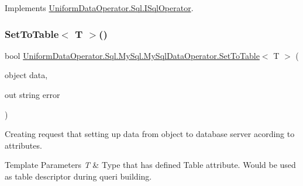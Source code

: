 Implements \mbox{\hyperlink{interface_uniform_data_operator_1_1_sql_1_1_i_sql_operator_ad05106eb6bd1a50f35b476a42821dfa3}{Uniform\+Data\+Operator.\+Sql.\+I\+Sql\+Operator}}.

\mbox{\label{class_uniform_data_operator_1_1_sql_1_1_my_sql_1_1_my_sql_data_operator_ac1bee965fd57e9b2949c09a6b72a9e3e}} 
\subsubsection{\texorpdfstring{Set\+To\+Table$<$ T $>$()}{SetToTable< T >()}}
{\footnotesize\ttfamily bool \mbox{\hyperlink{class_uniform_data_operator_1_1_sql_1_1_my_sql_1_1_my_sql_data_operator_a5a12c84883a7e4945b4fb3787a39b302}{Uniform\+Data\+Operator.\+Sql.\+My\+Sql.\+My\+Sql\+Data\+Operator.\+Set\+To\+Table}}$<$ T $>$ (\begin{DoxyParamCaption}\item[{object}]{data,  }\item[{out string}]{error }\end{DoxyParamCaption})}



Creating request that setting up data from object to database server acording to attributes. 


\begin{DoxyTemplParams}{Template Parameters}
{\em T} & Type that has defined Table attribute. Would be used as table descriptor during queri building.\\
\hline
\end{DoxyTemplParams}

